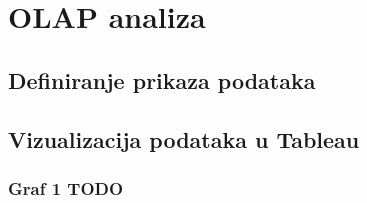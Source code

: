 \section{OLAP analiza}

\subsection{Definiranje prikaza podataka}
\subsection{Vizualizacija podataka u Tableau}
\subsubsection{Graf 1 TODO}